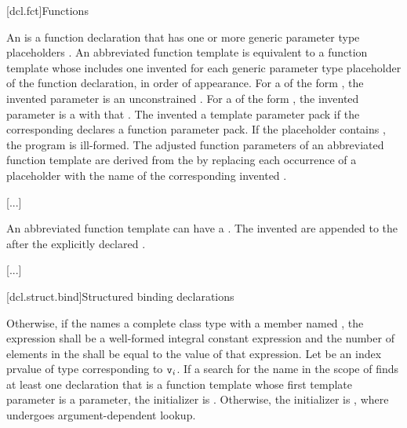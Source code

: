 \documentclass{wg21}
\begin{document}
[dcl.fct]{Functions}%

\pnum
An 
is a function declaration that has
one or more generic parameter type placeholders .
An abbreviated function template is equivalent to
a function template 
whose  includes
one invented 
for each generic parameter type placeholder
of the function declaration, in order of appearance.
For a  of the form ,
the invented parameter is
an unconstrained .
For a  of the form
 ,
the invented parameter is a  with
that .
The invented 
a template parameter pack
if the corresponding 
declares a function parameter pack.
If the placeholder contains ,
the program is ill-formed.
The adjusted function parameters of an abbreviated function template
are derived from the  by
replacing each occurrence of a placeholder with
the name of the corresponding invented .
\begin{example}
    \textcolor{noteclr}{[...]}
\end{example}

\pnum
An abbreviated function template can have a .
The invented  are
appended to the  after
the explicitly declared .
\begin{example}
    \textcolor{noteclr}{[...]}
\end{example}


[dcl.struct.bind]{Structured binding declarations}%

\pnum
Otherwise, if
the  
names a complete class type with a member named ,
the expression 
shall be a well-formed integral constant expression
and
the number of elements in
the  shall be equal to the value of that
expression.
Let  be an index prvalue of type 
corresponding to $\texttt{v}_i$.
If a search for the name 
in the scope of 
finds at least one declaration
that is a function template whose first template parameter
is a  parameter,
the initializer is
. Otherwise, the initializer is ,
where  undergoes argument-dependent lookup.
\end{document}
